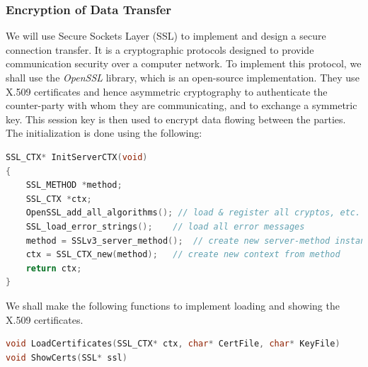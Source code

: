 \documentclass{article}
\begin{document}
				\subsubsection{Encryption of Data Transfer}
				We will use Secure Sockets Layer (SSL) to implement and design a secure connection transfer. It is a cryptographic protocols designed to provide communication security over a computer network. To implement this protocol, we shall use the \textit{OpenSSL} library, which is an open-source implementation. They use X.509 certificates and hence asymmetric cryptography to authenticate the counter-party with whom they are communicating, and to exchange a symmetric key. This session key is then used to encrypt data flowing between the parties. 
				\newline
				The initialization is done using the following:
				\begin{lstlisting}[language=C++, caption={Initialization}]
SSL_CTX* InitServerCTX(void)
{   
	SSL_METHOD *method;
    SSL_CTX *ctx; 
    OpenSSL_add_all_algorithms(); // load & register all cryptos, etc.
    SSL_load_error_strings();    // load all error messages
    method = SSLv3_server_method();  // create new server-method instance 
    ctx = SSL_CTX_new(method);   // create new context from method 
    return ctx;
}
				\end{lstlisting}

				We shall make the following functions to implement loading and showing the X.509 certificates.

				\begin{lstlisting}[language=C++, caption={X.509 Certificates}]
void LoadCertificates(SSL_CTX* ctx, char* CertFile, char* KeyFile)
void ShowCerts(SSL* ssl)
				\end{lstlisting}
\end{document}
